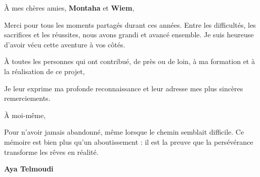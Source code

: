 \begin{center}
\begin{minipage}{0.9\textwidth}
\vspace{0.18cm}

\noindent À mes chères amies, \textbf{Montaha} et \textbf{Wiem},

Merci pour tous les moments partagés durant ces années. Entre les difficultés, les sacrifices et les réussites, nous avons grandi et avancé ensemble. Je suis heureuse d'avoir vécu cette aventure à vos côtés.

\vspace{0.18cm}

\noindent À toutes les personnes qui ont contribué, de près ou de loin, à ma formation et à la réalisation de ce projet,

Je leur exprime ma profonde reconnaissance et leur adresse mes plus sincères remerciements.

\vspace{0.18cm}

\noindent À moi-même,

Pour n'avoir jamais abandonné, même lorsque le chemin semblait difficile. Ce mémoire est bien plus qu'un aboutissement : il est la preuve que la persévérance transforme les rêves en réalité.

\vspace{0.4cm}

\textbf{Aya Telmoudi}

\end{minipage}
\end{center}
